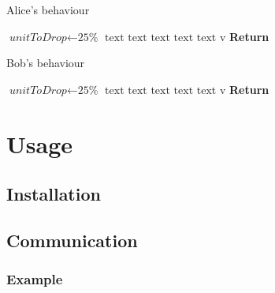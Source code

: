 \documentclass[12pt]{article}
\begin{document}
\begin{minipage}{0.46\textwidth}
    \begin{algorithm}[H]
        \centering
        \caption{Alice's behaviour}\label{alice:algo}
        \begin{algorithmic}[1]
            \State {} 
            \State $\textit{unitToDrop} \gets \text{25\%}$
            \State {}
            \State {}
            \Repeat
            \State {}
            \State $\text{text}$ 
            \State $\text{text}$ 
            \State $\text{text}$ 
            \State {}
            \State $\text{text}$
            \EndFor
            \State {}
            \Repeat
            \State {}
            \State $\text{text}$ 
            \State $\text{v}$ 
            \EndFor
            \State \textbf{Return}  
        \end{algorithmic}
    \end{algorithm}
    \end{minipage}
    \hfill
    \begin{minipage}{0.46\textwidth}
    \begin{algorithm}[H]
        \centering
        \caption{Bob's behaviour}\label{bob:algo}
        \begin{algorithmic}[1]
            \State {} 
            \State $\textit{unitToDrop} \gets \text{25\%}$
            \State {}
            \State {}
            \Repeat
            \State {}
            \State $\text{text}$ 
            \State $\text{text}$ 
            \State $\text{text}$ 
            \State {}
            \State $\text{text}$
            \EndFor
            \State {}
            \Repeat
            \State {}
            \State $\text{text}$ 
            \State $\text{v}$ 
            \EndFor
            \State \textbf{Return}  
        \end{algorithmic}
    \end{algorithm}
    \end{minipage}

\section{Usage}
\subsection{Installation}
\subsection{Communication}
\subsubsection{Example}






\end{document}
